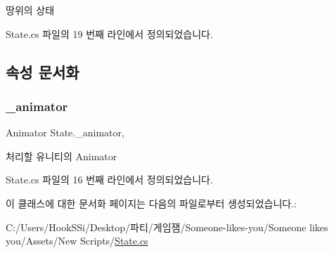 땅위의 상태 



State.\+cs 파일의 19 번째 라인에서 정의되었습니다.



\subsection{속성 문서화}
\mbox{\label{class_state_aff1dd03a1b3c63053b23371d6d70cd1a}} 
\subsubsection{\texorpdfstring{\_animator}{\_animator}}
{\footnotesize\ttfamily Animator State.\+\_\+animator\hspace{0.3cm}{\ttfamily [get]}, {\ttfamily [set]}}



처리할 유니티의 Animator 



State.\+cs 파일의 16 번째 라인에서 정의되었습니다.


\begin{DoxyCode}{0}

\end{DoxyCode}


이 클래스에 대한 문서화 페이지는 다음의 파일로부터 생성되었습니다.\+:\begin{DoxyCompactItemize}
\item 
C\+:/\+Users/\+Hook\+S\+Si/\+Desktop/파티/게임잼/\+Someone-\/likes-\/you/\+Someone likes you/\+Assets/\+New Scripts/\mbox{\hyperlink{_state_8cs}{State.\+cs}}\end{DoxyCompactItemize}
